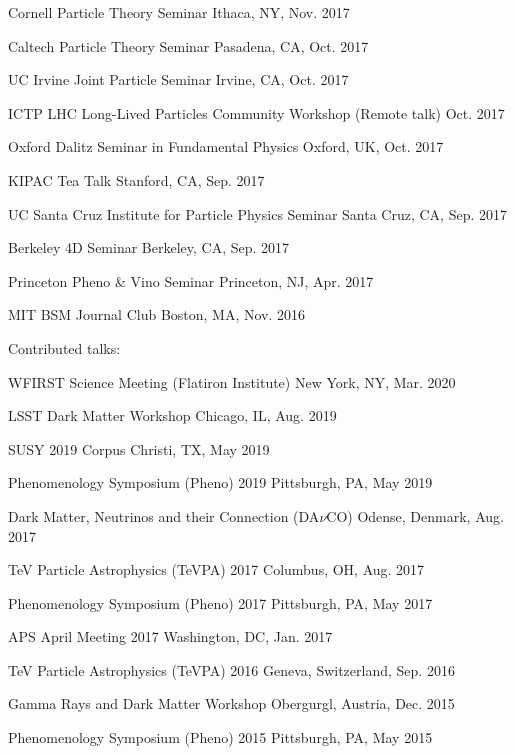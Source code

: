 \documentclass[11pt]{article}
\newenvironment{packed_itemize}{
\begin{itemize}[label=\raisebox{0.25ex}{\tiny$\bullet$}]
  \setlength{\itemsep}{3pt}
  \setlength{\parskip}{0pt}
  \setlength{\parsep}{0pt}}{\end{itemize}
}
\begin{document}
\begin{packed_itemize}
\item Cornell Particle Theory Seminar \hfill Ithaca, NY, Nov. 2017
\item Caltech Particle Theory Seminar \hfill Pasadena, CA, Oct. 2017
\item UC Irvine Joint Particle Seminar \hfill Irvine, CA, Oct. 2017
\item ICTP LHC Long-Lived Particles Community Workshop (Remote talk) \hfill Oct. 2017
\item Oxford Dalitz Seminar in Fundamental Physics  \hfill Oxford, UK, Oct. 2017
\item KIPAC Tea Talk  \hfill Stanford, CA, Sep. 2017
\item UC Santa Cruz Institute for Particle Physics Seminar  \hfill Santa Cruz, CA, Sep. 2017
\item Berkeley 4D Seminar  \hfill Berkeley, CA, Sep. 2017
\item Princeton Pheno \& Vino Seminar \hfill Princeton, NJ, Apr. 2017
\item MIT BSM Journal Club \hfill Boston, MA, Nov. 2016
\end{packed_itemize}

\noindent
Contributed talks:
\begin{packed_itemize}
  \item WFIRST Science Meeting (Flatiron Institute) \hfill New York, NY, Mar. 2020
  \item LSST Dark Matter Workshop \hfill Chicago, IL, Aug. 2019
  \item SUSY 2019 \hfill Corpus Christi, TX, May 2019
  \item Phenomenology Symposium (Pheno) 2019 \hfill Pittsburgh, PA, May 2019
  \item Dark Matter, Neutrinos and their Connection (DA$\nu$CO) \hfill Odense, Denmark, Aug. 2017
  \item TeV Particle Astrophysics (TeVPA) 2017 \hfill Columbus, OH, Aug. 2017 
  \item Phenomenology Symposium (Pheno) 2017 \hfill Pittsburgh, PA, May 2017 
  \item APS April Meeting 2017 \hfill Washington, DC, Jan. 2017 
  \item TeV Particle Astrophysics (TeVPA) 2016 \hfill Geneva, Switzerland, Sep. 2016 
  \item Gamma Rays and Dark Matter Workshop \hfill Obergurgl, Austria, Dec. 2015
  \item Phenomenology Symposium (Pheno) 2015 \hfill Pittsburgh, PA, May 2015
\end{packed_itemize}
\vspace{2.0mm}
\end{document}
